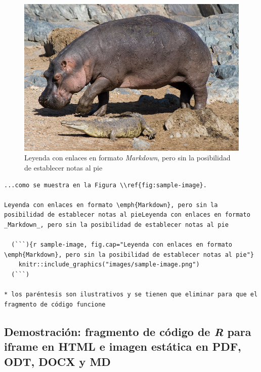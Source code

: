 \documentclass[
]{book}
\begin{document}
\begin{figure}
\centering
\includegraphics{images/sample-image.png}
\caption{\label{fig:sample-image}Leyenda con enlaces en formato \emph{Markdown}, pero sin la posibilidad de establecer notas al pie}
\end{figure}

\begin{verbatim}
...como se muestra en la Figura \\ref{fig:sample-image}.

Leyenda con enlaces en formato \emph{Markdown}, pero sin la posibilidad de establecer notas al pieLeyenda con enlaces en formato _Markdown_, pero sin la posibilidad de establecer notas al pie

  (```){r sample-image, fig.cap="Leyenda con enlaces en formato \emph{Markdown}, pero sin la posibilidad de establecer notas al pie"}
    knitr::include_graphics("images/sample-image.png")
  (```)

* los paréntesis son ilustrativos y se tienen que eliminar para que el fragmento de código funcione
\end{verbatim}

\hypertarget{demostraciuxf3n-fragmento-de-cuxf3digo-de-r-para-iframe-en-html-e-imagen-estuxe1tica-en-pdf-odt-docx-y-md}{%
\subsection{\texorpdfstring{Demostración: fragmento de código de \emph{R} para iframe en HTML e imagen estática en PDF, ODT, DOCX y MD}{Demostración: fragmento de código de R para iframe en HTML e imagen estática en PDF, ODT, DOCX y MD}}\label{demostraciuxf3n-fragmento-de-cuxf3digo-de-r-para-iframe-en-html-e-imagen-estuxe1tica-en-pdf-odt-docx-y-md}}
\end{document}
